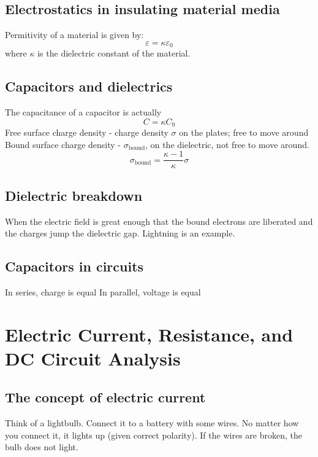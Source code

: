 \documentclass[twocolumn]{article}
\begin{document}
\subsection{Electrostatics in insulating material media}
\begin{outline}
	\1 Permitivity of a material is given by: \[\varepsilon=\kappa\varepsilon_0\] where $\kappa$ is the dielectric constant of the material. 
\end{outline}
\subsection{Capacitors and dielectrics}
\begin{outline}
	\1 The capacitance of a capacitor is actually \[C=\kappa C_0\]
	\1 Free surface charge density - charge density $\sigma$ on the plates; free to move around
	\1 Bound surface charge density - $\sigma_{\text{bound}}$, on the dielectric, not free to move around. \[\sigma_{\text{bound}}=\dfrac{\kappa-1}{\kappa}\sigma\]
\end{outline}
\subsection{Dielectric breakdown}
\begin{outline}
	\1 When the electric field is great enough that the bound electrons are liberated and the charges jump the dielectric gap. Lightning is an example. 
\end{outline}
\subsection{Capacitors in circuits}
	\begin{outline}
		\1 In series, charge is equal
		\1 In parallel, voltage is equal 
	\end{outline}
\section{Electric Current, Resistance, and DC Circuit Analysis}
\subsection{The concept of electric current}
\begin{outline}
	\1 Think of a lightbulb. Connect it to a battery with some wires. No matter how you connect it, it lights up (given correct polarity). If the wires are broken, the bulb does not light. 
\end{outline}
\end{document}
